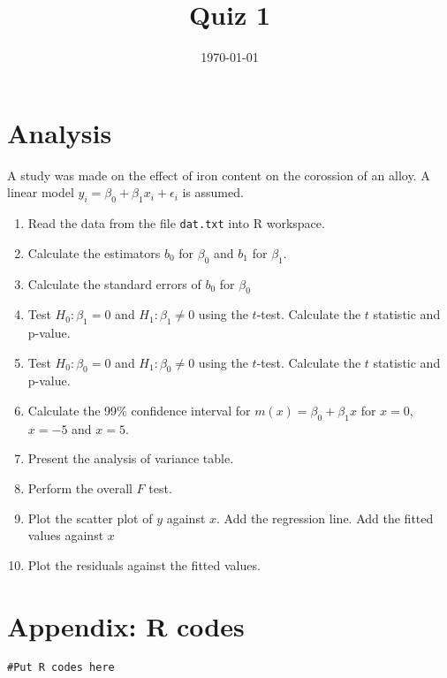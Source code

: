 \documentclass[12pt]{article}
\title{Quiz 1}
\author{ }
\date{\today}
\begin{document}
\maketitle

\section*{Analysis}

A study was made on the effect of iron content on the corossion of an alloy.
A linear model $y_i=\beta_0+\beta_1 x_i +\epsilon_i$ is assumed.

\begin{enumerate}
\item Read the data from the file \texttt{dat.txt} into R workspace.
\item Calculate the estimators $b_0$ for $\beta_0$ and $b_1$ for $\beta_1$.
\item Calculate the standard errors of $b_0$ for $\beta_0$
\item Test $H_0:\beta_1=0$ and $H_1:\beta_1\neq 0$ using the $t$-test.
Calculate the $t$ statistic and p-value.
\item Test $H_0:\beta_0=0$ and $H_1:\beta_0\neq 0$ using the $t$-test.
Calculate the $t$ statistic and p-value.
\item Calculate the 99\% confidence interval for
$m(x)=\beta_0+\beta_1 x$ for $x=0$, $x=-5$ and $x=5$.
\item Present the analysis of variance table.
\item Perform the overall $F$ test.
\item Plot the scatter plot of $y$ against $x$.
Add the regression line. Add the fitted values against $x$
\item Plot the residuals against the fitted values.
\end{enumerate}


\clearpage
\appendix
\section*{Appendix: R codes}
\begin{verbatim}
#Put R codes here
\end{verbatim}
\end{document}
